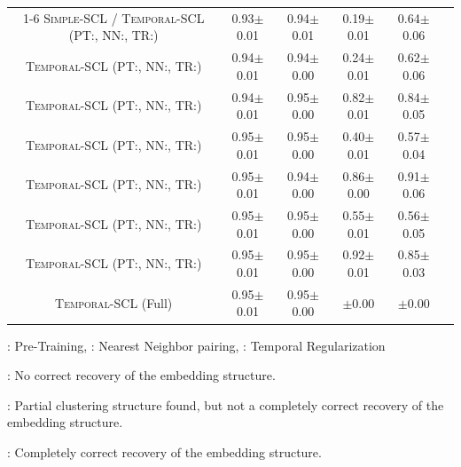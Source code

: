 \documentclass[pmlr,twocolumn,10pt]{jmlr} %
\newcommand{\cmark}{{\color{Green} \ding{51}}}
\newcommand{\xmark}{{\color{BrickRed} \ding{55}}}
\newcommand{\omark}{{\color{Dandelion} \ding{104}}}
\newcommand{\cbmark}{\ding{51}}
\newcommand{\xbmark}{\ding{55}}
\newcommand{\bftab}{\fontseries{b}\selectfont}
\begin{document}
\begin{table}[t]
{\begin{tabular}{cccccc}
\cmidrule(lr){1-6}
\textsc{Simple-SCL} / \textsc{Temporal-SCL} (PT:\xbmark, NN:\xbmark, TR:\xbmark)                                             & 0.93$\pm$0.01 & 0.94$\pm$0.01 & 0.19$\pm$0.01 & 0.64$\pm$0.06 & \xmark \\
\textsc{Temporal-SCL} (PT:\cbmark, NN:\xbmark, TR:\xbmark)      & 0.94$\pm$0.01 & 0.94$\pm$0.00 & 0.24$\pm$0.01 & 0.62$\pm$0.06 & \xmark \\
\textsc{Temporal-SCL} (PT:\xbmark, NN:\cbmark, TR:\xbmark)      & 0.94$\pm$0.01 & 0.95$\pm$0.00 & 0.82$\pm$0.01 & 0.84$\pm$0.05 & \omark \\
\textsc{Temporal-SCL} (PT:\xbmark, NN:\xbmark, TR:\cbmark)      & 0.95$\pm$0.01 & 0.95$\pm$0.00 & 0.40$\pm$0.01 & 0.57$\pm$0.04 & \xmark \\
\textsc{Temporal-SCL} (PT:\xbmark, NN:\cbmark, TR:\cbmark)      & 0.95$\pm$0.01 & 0.94$\pm$0.00 & 0.86$\pm$0.00 & 0.91$\pm$0.06 & \omark \\
\textsc{Temporal-SCL} (PT:\cbmark, NN:\xbmark, TR:\cbmark)      & 0.95$\pm$0.01 & 0.95$\pm$0.00 & 0.55$\pm$0.01 & 0.56$\pm$0.05 & \xmark \\
\textsc{Temporal-SCL} (PT:\cbmark, NN:\cbmark, TR:\xbmark)      & 0.95$\pm$0.01 & 0.95$\pm$0.00 & 0.92$\pm$0.01 & 0.85$\pm$0.03 & \omark \\
\textsc{Temporal-SCL} (Full)                                    & 0.95$\pm$0.01 & 0.95$\pm$0.00 & {\bftab 0.98$\pm$0.00} & {\bftab 1.00$\pm$0.00} & {\bftab \cmark}   \\ 
\bottomrule
\end{tabular}}

\vspace{.5ex}
{\scriptsize {\bftab{PT}}: Pre-Training, {\bftab{NN}}: Nearest Neighbor pairing, {\bftab{TR}}: Temporal Regularization}

\vspace{-.75ex}
{\scriptsize \xmark: No correct recovery of the embedding structure.}

\vspace{-.75ex}
{\scriptsize \omark: Partial clustering structure found, but not a completely correct recovery of the embedding structure.}

\vspace{-.75ex}
{\scriptsize \cmark: Completely correct recovery of the embedding structure.}
\label{tab:toyDataset_ratios}
\vspace{-1.5em}
\end{table}
\end{document}
